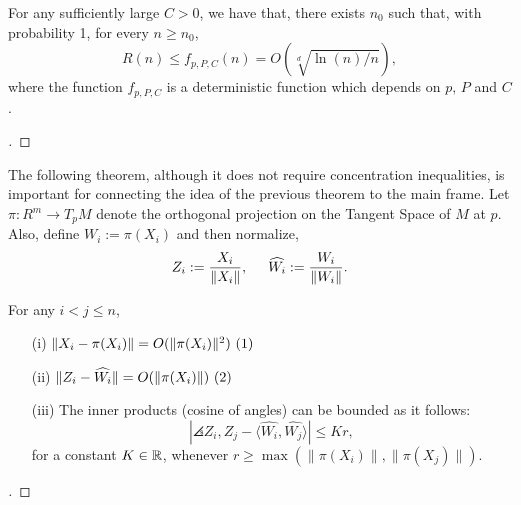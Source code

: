 \begin{theorem}\label{ade:T2}
  For any sufficiently large $C > 0$, we have that, there exists $n_0$ such that, with probability 1, for every $n \geq n_0$,
  \begin{equation}\label{ade:3}
    R(n) \leq f_{p,P,C}(n) = O(\sqrt[d]{\ln(n)/n}),
  \end{equation}
  where the function $f_{p,P,C}$ is a deterministic function which depends on $p,\, P$ and $C$.
\end{theorem}

\begin{proof}[]

\end{proof}

\vspace*{0.5 em}

The following theorem, although it does not require concentration inequalities, is important for connecting the idea of the previous theorem to the main frame. Let $\pi : R^m \to T_p M$ denote the orthogonal projection on the Tangent Space of $M$ at $p$. Also, define $W_i := \pi(X_i)$ and then normalize,
\begin{equation}\label{ade:4}
  Z_i := \frac{X_i}{\|X_i\|},\hspace*{5mm} \widehat{W_i} := \frac{W_i}{\|W_i\|}.
\end{equation}

\begin{theorem}\label{ade:T3}
  For any $i<j \leq n$,
  \begin{enumerate}
    \item[(i)]    \( \|X_i-\pi(X_i)\|  =   O(\|\pi (X_i)\|^2) \hfill\inlinetag  \)
    \item[(ii)]   \( \|Z_i-\widehat{W_i}\|  =   O(\|\pi (X_i) \|) \hfill\inlinetag \)
    \item[(iii)]  The inner products (cosine of angles) can be bounded as it follows:
    \begin{equation}\label{ade:7}
      |\angles{Z_i,Z_j} - \langle\widehat{W_i}, \widehat{W_j}\rangle| \leq K r,
    \end{equation}
    for a constant $K\in\mathbb{R}$, whenever $r \geq \max (\|\pi(X_i)\|,\|\pi(X_j)\|)$.
  \end{enumerate}
\end{theorem}
\begin{proof}[]

\end{proof}

